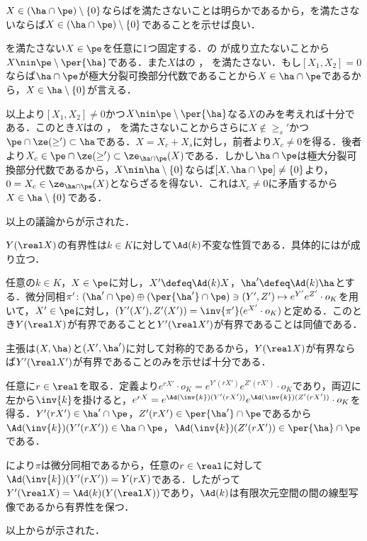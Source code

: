 \begin{npfwn}
\begin{enumerate}[label=\textbf{\arabic*.}]
    $X\in(\ha\cap\pe)\setminus\{0\} $ならばを満たさないことは明らかであるから，を満たさないならば$X\in(\ha\cap\pe)\setminus\{0\} $であることを示せば良い．

    
    
    を満たさない$X\in \pe$を任意に1つ固定する．の  が成り立たないことから$X\nin \pe\setminus\per{\ha}$である．また$X$はの ， を満たさない．もし$[X_1, X_2] = 0 $ ならば$\ha\cap\pe$が極大分裂可換部分代数であることから$X\in\ha\cap \pe $であるから，$X\in \ha\setminus\{0\} $が言える．

    以上より$[X_1,X_2] \neq 0$かつ$X\nin \pe\setminus\per{\ha}$なる$X$のみを考えれば十分である．このとき$X$はの ， を満たさないことからさらに$X\nin \ge_{s}' $かつ$\pe\cap\ze(\ge')\subset \ha $である．$X  = X_c + X_s $に対し，前者より$X_c\neq 0 $を得る．後者より$X_c\in \pe\cap\ze(\ge')\subset \ze_{\ha\cap\pe}(X) $である．しかし$\ha\cap \pe$は極大分裂可換部分代数であるから，$X\nin\ha\setminus\{0\} $ならば$[X, \ha\cap\pe ] \neq  \{0\}$より，$0 = X_c \in \ze_{\ha\cap\pe}(X) $とならざるを得ない．これは$X_c\neq 0 $に矛盾するから$X \in \ha\setminus\{0\}  $である．
    
    以上の議論からが示された．
  \end{enumerate}  
\end{npfwn}

$Y(\real X) $の有界性は$k\in K$に対して$\Ad(k) $不変な性質である．具体的にはが成り立つ．
\begin{lem}\label{lem:1101}
  任意の$k\in K$，$X\in \pe$に対し，$X'\defeq \Ad(k)X $，$\ha'\defeq \Ad(k)\ha $とする．微分同相$\pi'\colon (\ha'\cap \pe)\oplus (\per{\ha'}\cap \pe)\ni (Y',Z')\mapsto e^{Y'}e^{Z'}\cdot o_K  $を用いて，$X'\in \pe$に対し，$(Y'(X'), Z'(X')) = \inv{\pi'}(e^{X'}\cdot o_K) $と定める．このとき$Y(\real X)$が有界であることと$ Y'(\real X') $が有界であることは同値である．
\end{lem}

\begin{npfwn}
  主張は$(X,\ha) $と$(X',\ha')$に対して対称的であるから，$Y(\real X) $が有界ならば$Y'(\real X') $が有界であることのみを示せば十分である．

  任意に$r\in \real$を取る．定義より$e^{rX'}\cdot o_K = e^{Y'(r X')}e^{Z'(r X')}\cdot o_K  $であり，両辺に左から$\inv{k} $を掛けると，$e^{r X} = e^{\Ad(\inv{k})( Y'(r X'))}e^{\Ad(\inv{k})( Z'(r X'))}\cdot o_K  $を得る．$Y'(rX')\in \ha'\cap \pe $，$Z'(r X')\in \per{\ha'}\cap \pe $であるから$\Ad(\inv{k})(Y'(r X'))\in \ha\cap \pe $，$\Ad(\inv{k})(Z'(r X')) \in \per{\ha}\cap \pe $である．

  により$\pi$は微分同相であるから，任意の$r\in \real$に対して$\Ad(\inv{k})(Y'(r X')) = Y(rX)  $である．したがって$Y'(\real X) = \Ad(k)(Y(\real X))  $であり，$\Ad(k) $は有限次元空間の間の線型写像であるから有界性を保つ．

  以上からが示された．  
\end{npfwn}


